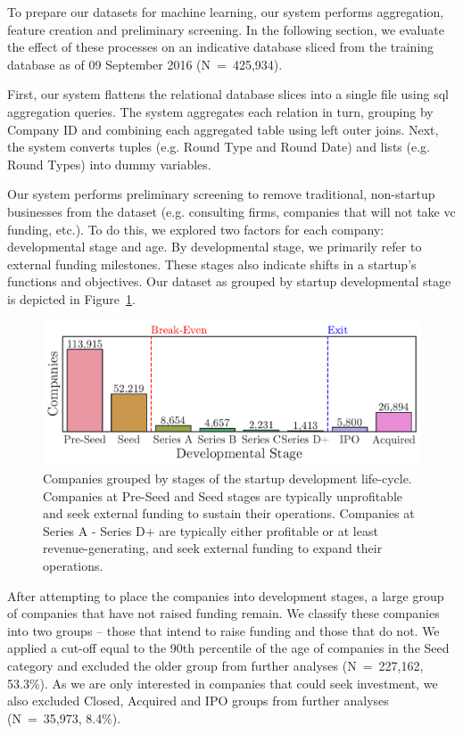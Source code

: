 \documentclass[../thesis/thesis.tex]{subfiles}
\begin{document}
To prepare our datasets for machine learning, our system performs aggregation, feature creation and preliminary screening. In the following section, we evaluate the effect of these processes on an indicative database sliced from the training database as of 09 September 2016 (N~=~425,934).

First, our system flattens the relational database slices into a single file using \gls{sql} aggregation queries. The system aggregates each relation in turn, grouping by Company ID and combining each aggregated table using left outer joins. Next, the system converts tuples (e.g. Round Type and Round Date) and lists (e.g. Round Types) into dummy variables.

Our system performs preliminary screening to remove traditional, non-startup businesses from the dataset (e.g. consulting firms, companies that will not take \gls{vc} funding, etc.). To do this, we explored two factors for each company: developmental stage and age. By developmental stage, we primarily refer to external funding milestones. These stages also indicate shifts in a startup's functions and objectives. Our dataset as grouped by startup developmental stage is depicted in Figure~\ref{fig:design:lifecycle}.

\begin{figure}[!htb]
    \centering
    \includegraphics[width=\textwidth]{../figures/design/descriptives_counts_stage}
    \caption[Startup development life-cycle]{Companies grouped by stages of the startup development life-cycle. Companies at Pre-Seed and Seed stages are typically unprofitable and seek external funding to sustain their operations. Companies at Series A - Series D+ are typically either profitable or at least revenue-generating, and seek external funding to expand their operations.}
    \label{fig:design:lifecycle}
\end{figure}

After attempting to place the companies into development stages, a large group of companies that have not raised funding remain. We classify these companies into two groups -- those that intend to raise funding and those that do not. We applied a cut-off equal to the 90th percentile of the age of companies in the Seed category and excluded the older group from further analyses (N~=~227,162,  53.3\%). As we are only interested in companies that could seek investment, we also excluded Closed, Acquired and IPO groups from further analyses (N~=~35,973, 8.4\%).
\end{document}
